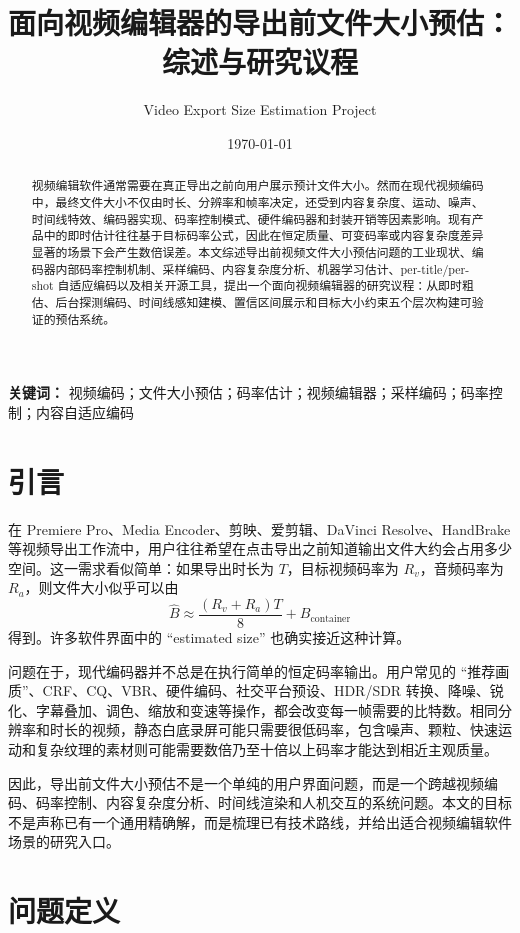 \documentclass[UTF8,a4paper,11pt]{ctexart}
\title{面向视频编辑器的导出前文件大小预估：综述与研究议程}
\author{Video Export Size Estimation Project}
\date{\today}
\begin{document}
\maketitle

\begin{abstract}
视频编辑软件通常需要在真正导出之前向用户展示预计文件大小。然而在现代视频编码中，最终文件大小不仅由时长、分辨率和帧率决定，还受到内容复杂度、运动、噪声、时间线特效、编码器实现、码率控制模式、硬件编码器和封装开销等因素影响。现有产品中的即时估计往往基于目标码率公式，因此在恒定质量、可变码率或内容复杂度差异显著的场景下会产生数倍误差。本文综述导出前视频文件大小预估问题的工业现状、编码器内部码率控制机制、采样编码、内容复杂度分析、机器学习估计、per-title/per-shot 自适应编码以及相关开源工具，提出一个面向视频编辑器的研究议程：从即时粗估、后台探测编码、时间线感知建模、置信区间展示和目标大小约束五个层次构建可验证的预估系统。
\end{abstract}

\noindent\textbf{关键词：} 视频编码；文件大小预估；码率估计；视频编辑器；采样编码；码率控制；内容自适应编码

\section{引言}

在 Premiere Pro、Media Encoder、剪映、爱剪辑、DaVinci Resolve、HandBrake 等视频导出工作流中，用户往往希望在点击导出之前知道输出文件大约会占用多少空间。这一需求看似简单：如果导出时长为 $T$，目标视频码率为 $R_v$，音频码率为 $R_a$，则文件大小似乎可以由
\begin{equation}
  \hat{B} \approx \frac{(R_v + R_a)T}{8} + B_{\mathrm{container}}
\end{equation}
得到。许多软件界面中的 ``estimated size'' 也确实接近这种计算。

问题在于，现代编码器并不总是在执行简单的恒定码率输出。用户常见的 ``推荐画质''、CRF、CQ、VBR、硬件编码、社交平台预设、HDR/SDR 转换、降噪、锐化、字幕叠加、调色、缩放和变速等操作，都会改变每一帧需要的比特数。相同分辨率和时长的视频，静态白底录屏可能只需要很低码率，包含噪声、颗粒、快速运动和复杂纹理的素材则可能需要数倍乃至十倍以上码率才能达到相近主观质量。

因此，导出前文件大小预估不是一个单纯的用户界面问题，而是一个跨越视频编码、码率控制、内容复杂度分析、时间线渲染和人机交互的系统问题。本文的目标不是声称已有一个通用精确解，而是梳理已有技术路线，并给出适合视频编辑软件场景的研究入口。

\section{问题定义}
\end{document}
